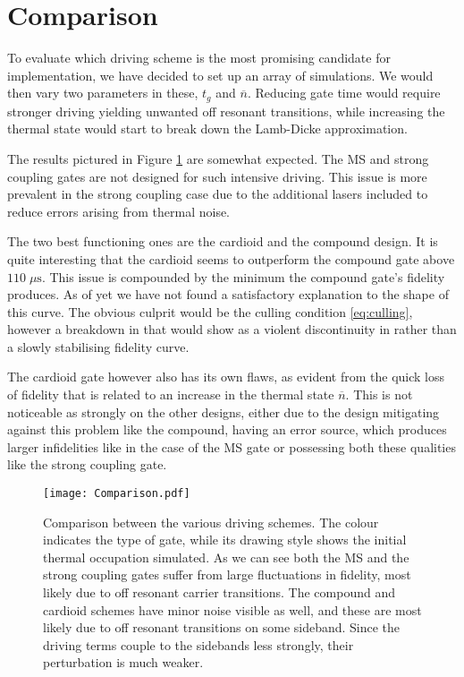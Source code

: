 \documentclass[12pt,twoside]{report}
\begin{document}
\section{Comparison}
\label{Driving_schemes:Comparison}

To evaluate which driving scheme is the most promising candidate for implementation, we have decided to set up an array of simulations. We would then vary two parameters in these, $t_g$ and $\overline{n}$. Reducing gate time would require stronger driving yielding unwanted off resonant transitions, while increasing the thermal state would start to break down the Lamb-Dicke approximation.

The results pictured in Figure \ref{fig:comparison} are somewhat expected. The MS and strong coupling gates are not designed for such intensive driving. This issue is more prevalent in the strong coupling case due to the additional lasers included to reduce errors arising from thermal noise.

The two best functioning ones are the cardioid and the compound design. It is quite interesting that the cardioid seems to outperform the compound gate above $110\;\mu\text{s}$. This issue is compounded by the minimum the compound gate's fidelity produces. As of yet we have not found a satisfactory explanation to the shape of this curve. The obvious culprit would be the culling condition \eqref{eq:culling}, however a breakdown in that would show as a violent discontinuity in rather than a slowly stabilising fidelity curve.

The cardioid gate however also has its own flaws, as evident from the quick loss of fidelity that is related to an increase in the thermal state $\overline{n}$. This is not noticeable as strongly on the other designs, either due to the design mitigating against this problem like the compound, having an error source, which produces larger infidelities like in the case of the MS gate or possessing both these qualities like the strong coupling gate.

\begin{figure}[t!]
	\centering
	\texttt{[image: Comparison.pdf]}
	\caption[Gate comparison]{Comparison between the various driving schemes. The colour indicates the type of gate, while its drawing style shows the initial thermal occupation simulated. As we can see both the MS and the strong coupling gates suffer from large fluctuations in fidelity, most likely due to off resonant carrier transitions. The compound and cardioid schemes have minor noise visible as well, and these are most likely due to off resonant transitions on some sideband. Since the driving terms couple to the sidebands less strongly, their perturbation is much weaker.}
	\label{fig:comparison}
\end{figure}
\end{document}
